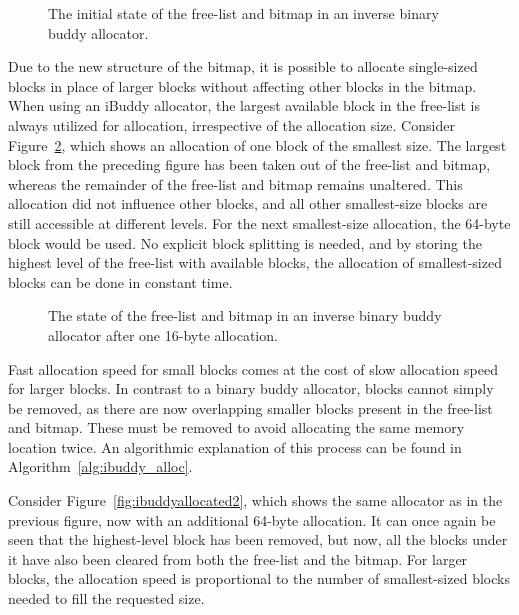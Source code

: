 \begin{figure}[h]
  \centering
  
  \caption{The initial state of the free-list and bitmap in an inverse binary buddy allocator.}
  \label{fig:ibuddyinitial}
\end{figure}

Due to the new structure of the bitmap, it is possible to allocate single-sized blocks in place of larger blocks without affecting other blocks in the bitmap. When using an iBuddy allocator, the largest available block in the free-list is always utilized for allocation, irrespective of the allocation size. Consider Figure~\ref{fig:ibuddyallocated}, which shows an allocation of one block of the smallest size. The largest block from the preceding figure has been taken out of the free-list and bitmap, whereas the remainder of the free-list and bitmap remains unaltered. This allocation did not influence other blocks, and all other smallest-size blocks are still accessible at different levels. For the next smallest-size allocation, the 64-byte block would be used. No explicit block splitting is needed, and by storing the highest level of the free-list with available blocks, the allocation of smallest-sized blocks can be done in constant time.

\begin{figure}[h]
  \centering
  
  \caption{The state of the free-list and bitmap in an inverse binary buddy allocator after one
    16-byte allocation.}
  \label{fig:ibuddyallocated}
\end{figure}

Fast allocation speed for small blocks comes at the cost of slow allocation speed for larger blocks. In contrast to a binary buddy allocator, blocks cannot simply be removed, as there are now overlapping smaller blocks present in the free-list and bitmap. These must be removed to avoid allocating the same memory location twice. An algorithmic explanation of this process can be found in Algorithm~\ref{alg:ibuddy_alloc}.

Consider Figure~\ref{fig:ibuddyallocated2}, which shows the same allocator as in the previous figure, now with an additional 64-byte allocation. It can once again be seen that the highest-level block has been removed, but now, all the blocks under it have also been cleared from both the free-list and the bitmap. For larger blocks, the allocation speed is proportional to the number of smallest-sized blocks needed to fill the requested size.

